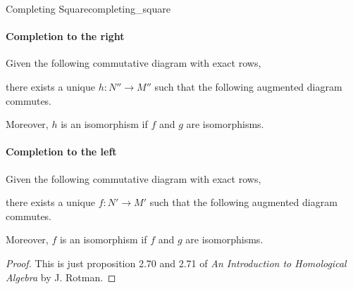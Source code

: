 \documentclass{article}
\begin{document}
\begin{proposition}{Completing Square}{completing_square}
    \paragraph*{Completion to the right}%
    Given the following commutative diagram with exact rows,
    \begin{center}
        \begin{center}
        \end{center}
    \end{center}
    there exists a unique $h\colon N''\to M''$ such that the following augmented diagram commutes.
    \begin{center}
        \begin{center}
        \end{center}
    \end{center}
    Moreover, $h$ is an isomorphism if $f$ and $g$ are isomorphisms.
    \paragraph*{Completion to the left}%
    Given the following commutative diagram with exact rows,
    \begin{center}
        \begin{center}
        \end{center}
    \end{center}
    there exists a unique $f\colon N'\to M'$ such that the following augmented diagram commutes.
    \begin{center}
        \begin{center}
        \end{center}
    \end{center}
    Moreover, $f$ is an isomorphism if $f$ and $g$ are isomorphisms.
\end{proposition}
\begin{proof}
    This is just proposition 2.70 and 2.71 of \textit{An Introduction to Homological Algebra} by J. Rotman.
\end{proof}

% 
% 
\end{document}

